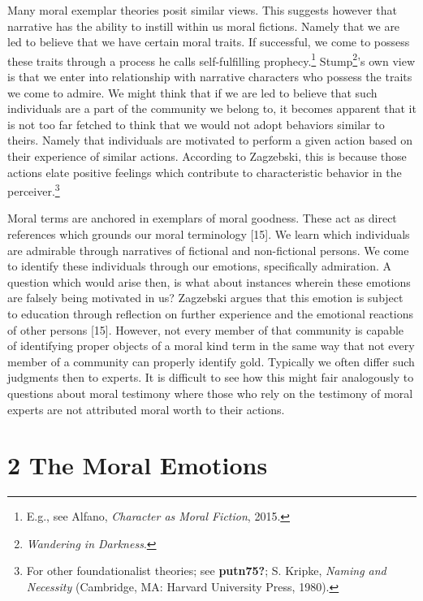 \documentclass[
  12pt,
]{book}
\theoremstyle{definition}
\theoremstyle{definition}
\theoremstyle{definition}
\theoremstyle{definition}
\theoremstyle{remark}
\begin{document}
Many moral exemplar theories posit similar views. This suggests however that narrative has the ability to instill within us moral fictions. Namely that we are led to believe that we have certain moral traits. If successful, we come to possess these traits through a process he calls self-fulfilling prophecy.\footnote{E.g., see Alfano, \emph{Character as Moral Fiction}, 2015.} Stump\footnote{\emph{Wandering in {Darkness}}.}'s own view is that we enter into relationship with narrative characters who possess the traits we come to admire. We might think that if we are led to believe that such individuals are a part of the community we belong to, it becomes apparent that it is not too far fetched to think that we would not adopt behaviors similar to theirs. Namely that individuals are motivated to perform a given action based on their experience of similar actions. According to Zagzebski, this is because those actions elate positive feelings which contribute to characteristic behavior in the perceiver.\footnote{For other foundationalist theories; see \textbf{putn75?}; S. Kripke, \emph{Naming and Necessity} (Cambridge, MA: Harvard University Press, 1980).}

Moral terms are anchored in exemplars of moral goodness. These act as direct references which grounds our moral terminology {[}15{]}. We learn which individuals are admirable through narratives of fictional and non-fictional persons. We come to identify these individuals through our emotions, specifically admiration. A question which would arise then, is what about instances wherein these emotions are falsely being motivated in us? Zagzebski argues that this emotion is subject to education through reflection on further experience and the emotional reactions of other persons {[}15{]}. However, not every member of that community is capable of identifying proper objects of a moral kind term in the same way that not every member of a community can properly identify gold. Typically we often differ such judgments then to experts. It is difficult to see how this might fair analogously to questions about moral testimony where those who rely on the testimony of moral experts are not attributed moral worth to their actions.

\section{2 The Moral Emotions}\label{the-moral-emotions}
\end{document}
